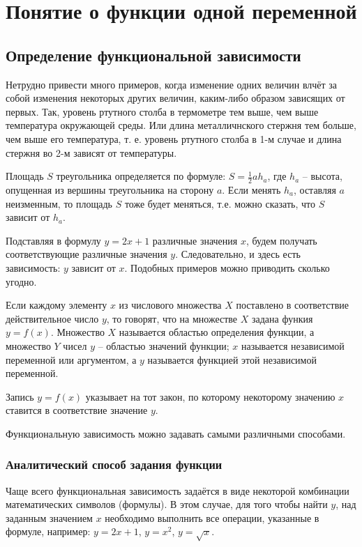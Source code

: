 \chapter{Понятие о функции одной переменной}
\section{Определение функциональной зависимости}
Нетрудно привести много примеров, когда изменение одних величин влчёт за собой
изменения некоторых других величин, каким-либо образом зависящих от первых.
Так, уровень ртутного столба в термометре тем выше, чем выше температура
окружающей среды. Или длина металличнского стержня тем больше, чем выше его
температура, т. е. уровень ртутного столба в 1-м случае и длина стержня во 2-м
зависят от температуры.

Площадь $S$ треугольника определяется по формуле: $S = \frac{1}{2}ah_a$, где
$h_a$ -- высота, опущенная из вершины треугольника на сторону $a$. Если менять
$h_a$, оставляя $a$ неизменным, то площадь $S$ тоже будет меняться, т.е. можно
сказать, что $S$ зависит от $h_a$.

Подставляя в формулу $y = 2x + 1$ различные значения $x$, будем получать
соответствующие различные значения $y$. Следовательно, и здесь есть
зависимость: $y$ зависит от $x$. Подобных примеров можно приводить сколько
угодно.

\begin{definition}
	Если каждому элементу $x$ из числового множества $X$ поставлено в
	соответствие действительное число $y$, то говорят, что на множестве $X$
	задана функия $y = f(x)$. Множество $X$ называется областью определения
	функции, а множество $Y$ чисел $y$ -- областью значений функции; $x$
	называется независимой переменной или аргументом, а $y$ называется
	функцией этой независимой переменной.
\end{definition}

Запись $y = f(x)$ указывает на тот закон, по которому некоторому значению $x$
ставится в соответствие значение $y$.

Функциональную зависимость можно задавать самыми различными способами.

\subsection{Аналитический способ задания функции}
Чаще всего функциональная зависимость задаётся в виде некоторой комбинации
математических символов (формулы). В этом случае, для того чтобы найти $y$, над
заданным значением $x$ необходимо выполнить все операции, указанные в формуле,
например: $y = 2x + 1$, $y = x^2$, $y = \sqrt{x}$.

